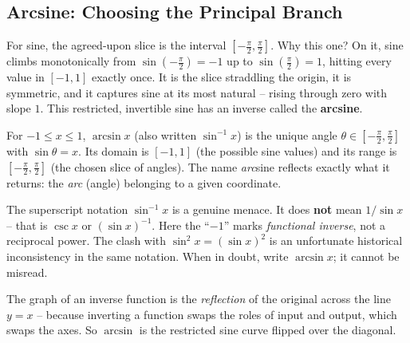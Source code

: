 \subsection{Arcsine: Choosing the Principal Branch}

For sine, the agreed-upon slice is the interval $[-\tfrac{\pi}{2}, \tfrac{\pi}{2}]$. Why this one? On it, sine climbs monotonically from $\sin(-\tfrac\pi2) = -1$ up to $\sin(\tfrac\pi2) = 1$, hitting every value in $[-1,1]$ exactly once. It is the slice straddling the origin, it is symmetric, and it captures sine at its most natural -- rising through zero with slope $1$. This restricted, invertible sine has an inverse called the \textbf{arcsine}.

\begin{definition}[Arcsine]
\label{ch04:def-arcsin}
For $-1 \le x \le 1$, $\arcsin x$ (also written $\sin^{-1}x$) is the unique angle $\theta \in [-\tfrac{\pi}{2}, \tfrac{\pi}{2}]$ with $\sin\theta = x$. Its domain is $[-1,1]$ (the possible sine values) and its range is $[-\tfrac{\pi}{2}, \tfrac{\pi}{2}]$ (the chosen slice of angles). The name \emph{arc}sine reflects exactly what it returns: the \emph{arc} (angle) belonging to a given coordinate.
\end{definition}

\begin{trapbox}
The superscript notation $\sin^{-1}x$ is a genuine menace. It does \textbf{not} mean $1/\sin x$ -- that is $\csc x$ or $(\sin x)^{-1}$. Here the ``$-1$'' marks \emph{functional inverse}, not a reciprocal power. The clash with $\sin^2 x = (\sin x)^2$ is an unfortunate historical inconsistency in the same notation. When in doubt, write $\arcsin x$; it cannot be misread.
\end{trapbox}

The graph of an inverse function is the \emph{reflection} of the original across the line $y=x$ -- because inverting a function swaps the roles of input and output, which swaps the axes. So $\arcsin$ is the restricted sine curve flipped over the diagonal.

